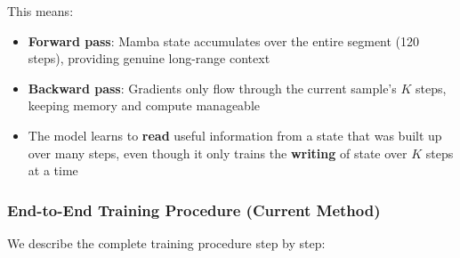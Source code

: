 \documentclass[11pt,a4paper]{article}
\begin{document}
This means:
\begin{itemize}[nosep]
  \item \textbf{Forward pass}: Mamba state accumulates over the entire segment (120 steps), providing genuine long-range context
  \item \textbf{Backward pass}: Gradients only flow through the current sample's $K$ steps, keeping memory and compute manageable
  \item The model learns to \textbf{read} useful information from a state that was built up over many steps, even though it only trains the \textbf{writing} of state over $K$ steps at a time
\end{itemize}

\subsubsection{End-to-End Training Procedure (Current Method)}

We describe the complete training procedure step by step:
\end{document}
